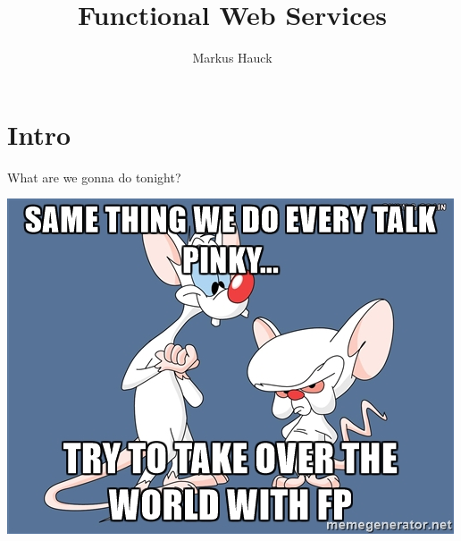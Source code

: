 \documentclass{beamer}
\author{Markus Hauck}
\institute{codecentric AG}
\title{Functional Web Services}
\begin{document}
{
  \begin{frame}
    \titlepage{}
  \end{frame}
}

\section{Intro}

\begin{frame}
  \begin{center}
    \huge
    What are we gonna do tonight?
  \end{center}
\end{frame}

\begin{frame}
  \begin{center}
    \includegraphics[width=0.7\paperwidth]{pics/pinkybrain.jpg}
  \end{center}
\end{frame}
\end{document}
